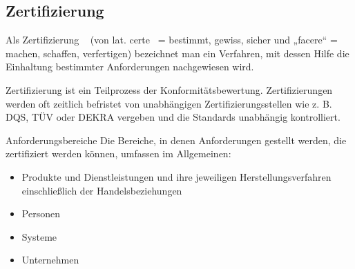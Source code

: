 \subsection{Zertifizierung}

Als \glqq Zertifizierung \grqq~ (von lat. \glqq certe\grqq~ = bestimmt, gewiss, sicher und „facere“ = machen, schaffen, verfertigen) bezeichnet man ein Verfahren, mit dessen Hilfe die Einhaltung bestimmter Anforderungen nachgewiesen wird.

Zertifizierung ist ein Teilprozess der Konformitätsbewertung. Zertifizierungen werden oft zeitlich befristet von unabhängigen Zertifizierungsstellen wie z. B. DQS, TÜV oder DEKRA vergeben und die Standards unabhängig kontrolliert.

Anforderungsbereiche\newline
Die Bereiche, in denen Anforderungen gestellt werden, die zertifiziert werden können, umfassen im Allgemeinen:
\begin{itemize}
\item Produkte und Dienstleistungen und ihre jeweiligen Herstellungsverfahren einschließlich der Handelsbeziehungen
\item Personen
\item Systeme
\item Unternehmen
\end{itemize}

